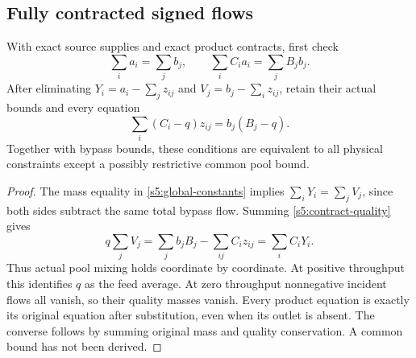 \subsection{Fully contracted signed flows}\label{s5:scaled}

\begin{lemma}\label{s5:conservation}
With exact source supplies and exact product contracts, first check
\begin{equation}
 \sum_i a_i=\sum_j b_j,\qquad
 \sum_i C_i a_i=\sum_j B_jb_j.
 \label{s5:global-constants}
\end{equation}
After eliminating $Y_i=a_i-\sum_jz_{ij}$ and
$V_j=b_j-\sum_i z_{ij}$, retain their actual bounds and every equation
\begin{equation}
 \sum_i(C_i-q)z_{ij}=b_j(B_j-q).
 \label{s5:contract-quality}
\end{equation}
Together with bypass bounds, these conditions are equivalent to all
physical constraints except a possibly restrictive common pool bound.
\end{lemma}
\begin{proof}
The mass equality in \eqref{s5:global-constants} implies
$\sum_iY_i=\sum_jV_j$, since both sides subtract the same total bypass
flow. Summing \eqref{s5:contract-quality} gives
\[
 q\sum_jV_j=\sum_j b_jB_j-\sum_{ij}C_i z_{ij}
                         =\sum_i C_iY_i.
\]
Thus actual pool mixing holds coordinate by coordinate. At positive
throughput this identifies $q$ as the feed average. At zero throughput
nonnegative incident flows all vanish, so their quality masses vanish.
Every product equation is exactly its original equation after substitution,
even when its outlet is absent. The converse follows by summing original
mass and quality conservation. A common bound has not been derived.
\end{proof}

